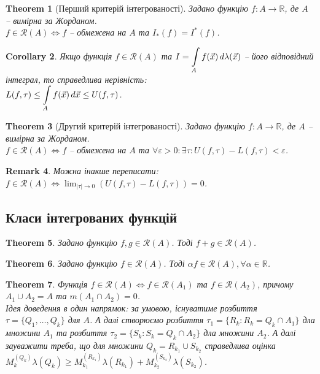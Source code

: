 \documentclass[a4paper, 10pt]{article}
\def\huge{\displaystyle}
\theoremstyle{theoremdd}
\newtheorem{theorem}{Theorem}[subsection]
\theoremstyle{theoremdd}
\theoremstyle{theoremdd}
\theoremstyle{theoremdd}
\theoremstyle{theoremdd}
\theoremstyle{theoremdd}
\theoremstyle{theoremdd}
\theoremstyle{theoremdd}
\theoremstyle{theoremdd}
\theoremstyle{theoremdd}
\theoremstyle{theoremdd}
\newtheorem{remark}[theorem]{Remark}
\theoremstyle{theoremdd}
\theoremstyle{theoremdd}
\theoremstyle{theoremdd}
\newtheorem{corollary}[theorem]{Corollary}
\theoremstyle{theoremdd}
\begin{document}
\begin{theorem}[Перший критерій інтегрованості]
Задано функцію $f \colon A \to \mathbb{R}$, де $A$ -- вимірна за Жорданом.\\
$f \in \mathcal{R}(A) \iff f$ -- обмежена на $A$ та $I_*(f) = I^*(f)$.
\end{theorem}

\begin{corollary}
Якщо функція $f \in \mathcal{R}(A)$ та $I = \huge\int\displaylimits_A f(\vec{x})\,d\lambda(\vec{x})$ -- його відповідний інтеграл, то справедлива нерівність:\\
$L(f,\tau) \leq \huge\int\displaylimits_A f(\vec{x})\,d\vec{x} \leq U(f, \tau)$.
\end{corollary}

\begin{theorem}[Другий критерій інтегрованості]
Задано функцію $f \colon A \to \mathbb{R}$, де $A$ -- вимірна за Жорданом.\\
$f \in \mathcal{R}(A) \iff f$ -- обмежена на $A$ та $\forall \varepsilon > 0: \exists \tau: U(f,\tau) - L(f,\tau) < \varepsilon$.
\end{theorem}

\begin{remark}
Можна інакше переписати: $f \in \mathcal{R}(A) \iff \huge\lim_{|\tau| \to 0} (U(f,\tau) - L(f,\tau)) = 0$.
\end{remark}

\subsection{Класи інтегрованих функцій}
\begin{theorem}
Задано функцію $f,g \in \mathcal{R}(A)$. Тоді $f+g \in \mathcal{R}(A)$.
\end{theorem}

\begin{theorem}
Задано функцію $f \in \mathcal{R}(A)$. Тоді $\alpha f \in \mathcal{R}(A), \forall \alpha \in \mathbb{R}$.
\end{theorem}

\begin{theorem}
Функція $f \in \mathcal{R}(A) \iff f \in \mathcal{R}(A_1)$ та $f \in \mathcal{R}(A_2)$, причому $A_1 \cup A_2 = A$ та $m(A_1 \cap A_2) = 0$.
\bigskip \\
Ідея доведення в один напрямок: за умовою, існуватиме розбиття $\tau = \{Q_1,\dots,Q_k\}$ для $A$. А далі створюємо розбиття $\tau_1 = \{R_k: R_k = Q_k \cap A_1\}$ дла множини $A_1$ та розбиття $\tau_2 = \{S_k: S_k = Q_k \cap A_2\}$ дла множини $A_2$. А далі зауважити треба, що для множини $Q_k = R_{k_1} \cup S_{k_2}$ справедлива оцінка $M_k^{(Q_k)}\lambda (Q_k) \geq M_{k_1}^{(R_{k_1})} \lambda(R_{k_1}) + M_{k_2}^{(S_{k_2})} \lambda(S_{k_2})$.
\end{theorem}
\end{document}
